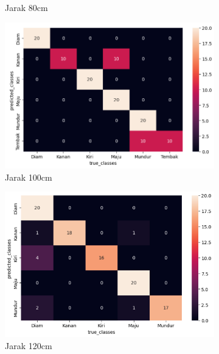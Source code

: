 \begin{figure}[H]
\begin{subfigure}{0.4\textwidth}
    \caption{Jarak 80cm}
    \label{fig:cm80}
  \end{subfigure}
  \begin{subfigure}{0.4\textwidth}
    \centering
    \includegraphics[width=\linewidth]{../Gambar/cm100.png}
    \caption{Jarak 100cm}
    \label{fig:cm100}
  \end{subfigure}
  \begin{subfigure}{0.4\textwidth}
    \centering
    \includegraphics[width=\linewidth]{../Gambar/cm120.png}
    \caption{Jarak 120cm}
    \label{fig:cm120}
  \end{subfigure}
  \begin{subfigure}{0.4\textwidth}
    \centering

\end{subfigure}
\end{figure}
